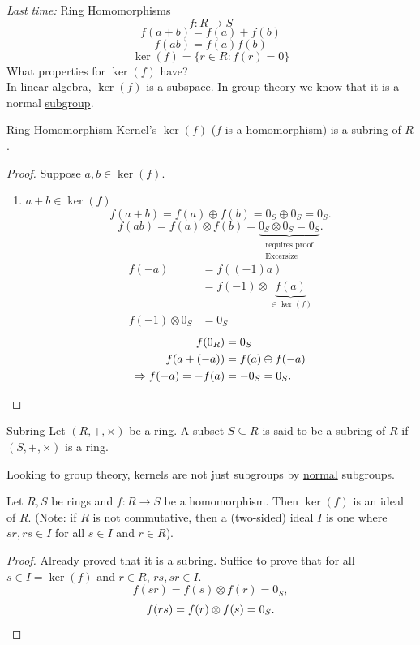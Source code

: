 \documentclass[twoside, openright, fontsize=10pt, headings=big]{scrbook}
\begin{document}
\textit{Last time:} Ring Homomorphisms
\[
    f: R\to S
\]
\[
    f(a+b)=f(a)+f(b)
\]
\[
    f(ab)=f(a)f(b)
\]
\[
\ker(f)=\{r\in R: f(r)=0\}
\]
What properties for $\ker(f)$ have?\\
In linear algebra, $\ker(f)$ is a \underline{subspace}. In group theory we know that it is a normal \underline{subgroup}.
\begin{lemma}{Ring Homomorphism Kernel's}{}
    $\ker(f)$ ($f$ is a homomorphism) is a subring of $R$.
\end{lemma}
\begin{proof}
    Suppose $a,b\in\ker(f)$.
    \begin{enumerate}
        \item $a+b\in\ker(f)$
        \[
            f(a+b)=f(a)\oplus f(b)=0_S\oplus 0_S=0_S.
        \]
        \[
            f(ab)=f(a)\otimes f(b)=\underbrace{0_S\otimes 0_S=0_S}_{\substack{\text{requires proof} \\ \text{Excersize}}}.
        \]
        \begin{align*}
            f(-a)&=f((-1)a)\\
            &=f(-1)\otimes \underbrace{f(a)}_{\in \ker(f)}\\
            f(-1)\otimes 0_S&=0_S
        \end{align*}
        \begin{align*}
            f(0_R)&=0_S\\
            f(a+(-a))&=f(a)\oplus f(-a)\\
            \Rightarrow f(-a)=-f(a)&=-0_S=0_S.\qedhere
        \end{align*}
    \end{enumerate}
\end{proof}
\begin{definition}{Subring}{}
    Let $(R,+,\times)$ be a ring. A subset $S\subseteq R$ is said to be a subring of $R$ if $(S,+,\times)$ is a ring.
\end{definition}
Looking to group theory, kernels are not just subgroups by \underline{normal} subgroups.
\begin{proposition}{}{}
    Let $R,S$ be rings and $f:R\to S$ be a homomorphism. Then $\ker(f)$ is an ideal of $R$. (Note: if $R$ is not commutative, then a (two-sided) ideal $I$ is one where $sr,rs\in I$ for all $s\in I$ and $r\in R$).    
\end{proposition}
\begin{proof}
    Already proved that it is a subring. Suffice to prove that for all $s\in I=\ker(f)$ and $r\in R$, $rs,sr\in I$.
    \[
        f(sr)=f(s)\otimes f(r)=0_S,
    \]
    \[
        f(rs)=f(r)\otimes f(s)=0_S.\qedhere
    \]    
\end{proof}
\end{document}
